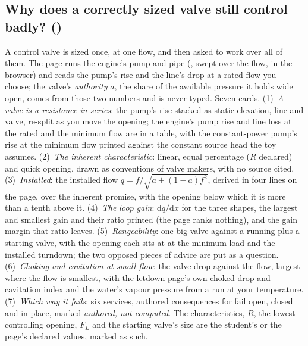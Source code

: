 \documentclass[11pt,a4paper]{article}
\begin{document}
\subsection*{Why does a correctly sized valve still control badly? \quad()}\label{sec:edu-control-valve}
A control valve is sized once, at one flow, and then asked to work over all of
them.  The page runs the engine's pump and pipe
(, swept over the flow, in the browser) and
reads the pump's rise and the line's drop at a rated flow you choose; the
valve's \emph{authority} $a$, the share of the available pressure it holds wide
open, comes from those two numbers and is never typed.  Seven cards.
(1)~\emph{A valve is a resistance in series}: the pump's rise stacked as static
elevation, line and valve, re-split as you move the opening; the engine's pump
rise and line loss at the rated and the minimum flow are in a table, with the
constant-power pump's rise at the minimum flow printed against the constant
source head the toy assumes.  (2)~\emph{The inherent characteristic}: linear,
equal percentage ($R$ declared) and quick opening, drawn as conventions of valve
makers, with no source cited.  (3)~\emph{Installed}: the installed flow
$q=f/\sqrt{a+(1-a)f^2}$, derived in four lines on the page, over the inherent
promise, with the opening below which it is more than a tenth above it.
(4)~\emph{The loop gain}: $\mathrm{d}q/\mathrm{d}x$ for the three shapes, the
largest and smallest gain and their ratio printed (the page ranks nothing), and
the gain margin that ratio leaves.  (5)~\emph{Rangeability}: one big valve
against a running plus a starting valve, with the opening each sits at at the
minimum load and the installed turndown; the two opposed pieces of advice are
put as a question.  (6)~\emph{Choking and cavitation at small flow}: the valve
drop against the flow, largest where the flow is smallest, with the letdown
page's own choked drop and cavitation index and the water's vapour pressure
from a  run at your temperature.  (7)~\emph{Which way it
fails}: six services, authored consequences for fail open, closed and in place,
marked \emph{authored, not computed}.  The characteristics, $R$, the lowest
controlling opening, $F_L$ and the starting valve's size are the student's or
the page's declared values, marked as such.
\end{document}

